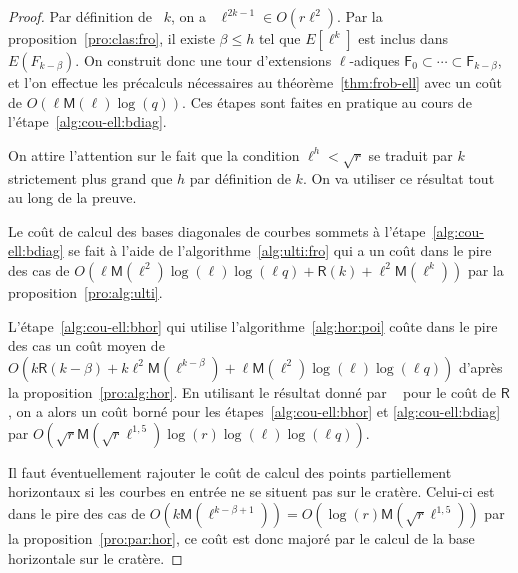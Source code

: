 \documentclass[10pt,a4paper]{book}
\theoremstyle{plain}
\theoremstyle{definition}
\theoremstyle{definition}
\theoremstyle{definition}
\theoremstyle{definition}
\theoremstyle{remark}
\theoremstyle{remark}
\theoremstyle{definition}
\begin{document}
\begin{proof}
Par définition de ~$k$, on a ~$\ell^{2k-1} \in O(r\ell^2)$.
  Par la proposition~\ref{pro:clas:fro}, il existe $\beta \leqslant h$ tel que
  $E[\ell^k]$ est inclus dans $E(F_{k-\beta})$. On construit donc une
  tour d'extensions $\ell$-adiques $\mathsf{F}_0\subset\cdots\subset 
  \mathsf{F}_{k-\beta}$, et l'on effectue les précalculs nécessaires au 
  théorème~\ref{thm:frob-ell} avec un coût de 
  $O(\ell\mathsf{M}(\ell)\log(q))$. Ces étapes sont faites en pratique au cours
  de l'étape~\ref{alg:cou-ell:bdiag}.
  
  On attire l'attention sur le fait que la condition $\ell^h<\sqrt{r}$ se traduit par 
  $k$ strictement plus grand que $h$ par définition de $k$.
  On va utiliser ce résultat tout au long de la preuve. 
 
  Le coût de calcul des bases diagonales de courbes sommets à 
  l'étape~\ref{alg:cou-ell:bdiag} se fait à l'aide de 
  l'algorithme~\ref{alg:ulti:fro} qui a un coût dans le pire des cas
  de 
  $O(\ell\mathsf{M}(\ell^2)\log(\ell)\log(\ell q)+\mathsf{R}(k) +  \ell^2\mathsf{M}(\ell^{k}))$ 
  par la proposition~\ref{pro:alg:ulti}. %

  L'étape~\ref{alg:cou-ell:bhor} qui utilise 
  l'algorithme~\ref{alg:hor:poi} coûte dans le pire des cas un coût moyen de
  $O(k\mathsf{R}(k-\beta) + k\ell^2\mathsf{M}(\ell^{k-\beta}) + \ell\mathsf{M}(\ell^2)\log(\ell)\log(\ell q))$ d'après la 
  proposition~\ref{pro:alg:hor}.
  En utilisant le  résultat  donné par ~\cite[Chapter~14.5]{vzGJG03} pour le 
  coût de $\mathsf{R}$, on a alors un coût borné pour les 
  étapes~\ref{alg:cou-ell:bhor} et \ref{alg:cou-ell:bdiag} par 
  $O(\sqrt{r}\mathsf{M}(\sqrt{r}\ell^{1,5})\log(r)\log(\ell)\log(\ell q))$.
  
  Il faut éventuellement rajouter le coût de calcul des points partiellement 
  horizontaux si les courbes en entrée ne se situent pas sur le cratère. 
  Celui-ci est dans le pire des cas de
  $O(k\mathsf{M}(\ell^{k-\beta+1})) = O(\log(r) \mathsf{M}(\sqrt{r} \ell^{1,5}) )$ par la proposition~\ref{pro:par:hor}, ce 
  coût est donc majoré par le calcul de la base horizontale sur le cratère.


\end{proof}
\end{document}
